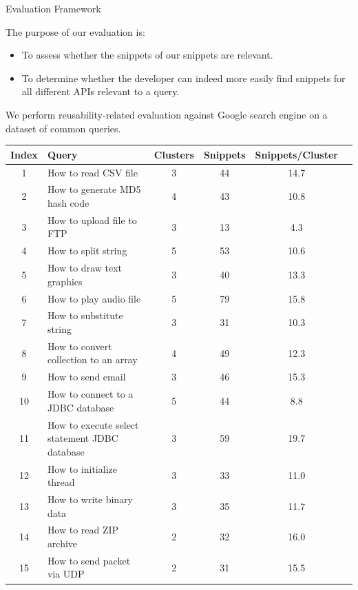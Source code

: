 \documentclass[compress]{beamer}
\begin{document}
\begin{frame}{Evaluation Framework}

The purpose of our evaluation is:
\begin{itemize}

	\item To assess whether the snippets of our snippets are relevant.
	\item To determine whether the developer can indeed more easily find snippets for all different APIs relevant to a query.
	
\end{itemize}


We perform reusability-related evaluation against Google search engine on a dataset of common queries.

\begin{table}
\centering
\tiny
\begin{tabular}{ c l c c c c }
\hline
\textbf{Index} & \textbf{Query} & \textbf{Clusters} & \textbf{Snippets} & \textbf{Snippets/Cluster}\\
\hline
1 & How to read CSV file & 3 & 44 & 14.7\\
2 & How to generate MD5 hash code & 4 & 43 & 10.8\\
3 & How to upload file to FTP & 3 & 13 & 4.3\\
4 & How to split string & 5 & 53 & 10.6\\
5 & How to draw text graphics & 3 & 40 & 13.3\\
6 & How to play audio file & 5 & 79 & 15.8\\
7 & How to substitute string & 3 & 31 & 10.3\\
8 & How to convert collection to an array & 4 & 49 & 12.3\\
9 & How to send email & 3 & 46 & 15.3\\
10& How to connect to a JDBC database & 5 & 44 & 8.8\\
11& How to execute select statement JDBC database & 3 & 59 & 19.7\\
12& How to initialize thread & 3 & 33 & 11.0\\
13& How to write binary data & 3 & 35 & 11.7\\
14& How to read ZIP archive & 2 & 32 & 16.0\\
15& How to send packet via UDP & 2 & 31 & 15.5\\
\hline
\end{tabular}
\end{table}

\end{frame}
\end{document}
